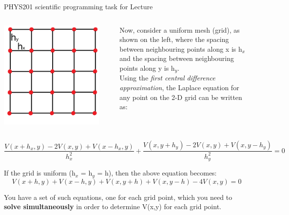 {%
%
%

\begin{frame}{PHYS201 scientific programming task for Lecture \thislecture}

{\small

\begin{columns}
  \begin{column}{0.25\textwidth}
   \begin{center}
     \includegraphics[width=0.90\textwidth]{./images/problems/lect03_computing_grid2d.png}
   \end{center}
  \end{column}
  \begin{column}{0.75\textwidth}
    Now, consider a uniform mesh (grid), as shown on the left,
    where the spacing between neighbouring points along x is h$_x$
    and the spacing between neighbouring points along y is h$_y$.\\
    \vspace{0.2cm}
    Using the {\em first central difference approximation},
    the Laplace equation for any point on the 2-D grid can be written as:
  \end{column}
\end{columns}

\begin{equation*}
   \frac{V(x+h_x,y) - 2V(x,y) + V(x-h_x, y)}{h_x^2} +
   \frac{V(x,y+h_y) - 2V(x,y) + V(x, y-h_y)}{h_y^2} = 0
\end{equation*}

If the grid is uniform (h$_x$ = h$_y$ = h), then the above equation becomes:
\begin{equation*}
   V(x+h,y) + V(x-h, y) +
   V(x,y+h) + V(x, y-h) - 4V(x,y) = 0
\end{equation*}

You have a set of such equations, one for each grid point, which you need
to {\bf solve simultaneously} in order to determine V(x,y) for each grid point.
}
\end{frame}


} %

